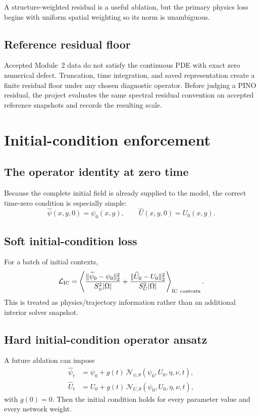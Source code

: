 \documentclass[11pt]{article}
\newcommand{\average}[1]{\left\langle #1\right\rangle}
\newcommand{\Lic}{\mathcal{L}_{\mathrm{IC}}}
\begin{document}
A structure-weighted residual is a useful ablation, but the primary physics loss begins with uniform spatial weighting so its norm is unambiguous.

\subsection{Reference residual floor}
Accepted Module~2 data do not satisfy the continuous PDE with exact zero numerical defect. Truncation, time integration, and saved representation create a finite residual floor under any chosen diagnostic operator. Before judging a PINO residual, the project evaluates the same spectral residual convention on accepted reference snapshots and records the resulting scale.

\section{Initial-condition enforcement}
\label{sec:ic}

\subsection{The operator identity at zero time}
Because the complete initial field is already supplied to the model, the correct time-zero condition is especially simple:
\begin{equation}
\widehat\psi(x,y,0)=\psi_0(x,y),
\qquad
\widehat U(x,y,0)=U_0(x,y).
\end{equation}

\subsection{Soft initial-condition loss}
For a batch of initial contexts,
\begin{equation}
\Lic=
\average{
\frac{\|\widehat\psi_0-\psi_0\|_2^2}{S_\psi^2|\Omega|}
+
\frac{\|\widehat U_0-U_0\|_2^2}{S_U^2|\Omega|}
}_{\rm IC\ contexts}.
\label{eq:ic_loss}
\end{equation}
This is treated as physics/trajectory information rather than an additional interior solver snapshot.

\subsection{Hard initial-condition operator ansatz}
A future ablation can impose
\begin{align}
\widehat\psi_t&=\psi_0+g(t)\,\mathcal{N}_{\psi,\theta}(\psi_0,U_0,\eta,\nu,t),\\
\widehat U_t&=U_0+g(t)\,\mathcal{N}_{U,\theta}(\psi_0,U_0,\eta,\nu,t),
\end{align}
with $g(0)=0$. Then the initial condition holds for every parameter value and every network weight.
\end{document}
